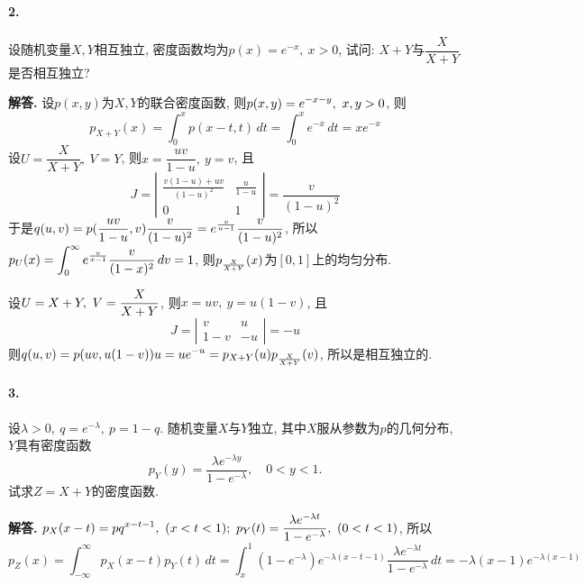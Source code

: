 \documentclass[12pt, a4paper, oneside]{ctexart}
\newenvironment{solution}{\par\noindent\textbf{解答. }}{\bigskip\par}
\begin{document}
\paragraph{2.}设随机变量$X,Y$相互独立, 密度函数均为$p(x) = e^{-x},\ x > 0$, 试问: $X+Y$与$\dfrac{X}{X+Y}$是否相互独立?
\begin{solution}
    设$p(x, y)$为$X,Y$的联合密度函数, 则$\displaystyle p(x, y) = e^{-x-y},\ x, y > 0$, 则
    \begin{equation*}
        p_{X+Y}(x)  = \int_0^xp(x-t,t)\,dt = \int_0^xe^{-x}\,dt = xe^{-x}
    \end{equation*}
    设$U = \dfrac{X}{X+Y},\ V= Y$, 则$x = \dfrac{uv}{1-u},\ y = v$, 且
    \begin{equation*}
        J = \left|\begin{matrix}
            \frac{v(1-u)+uv}{(1-u)^2}&\frac{u}{1-u}\\
            0&1
        \end{matrix}\right| = \frac{v}{(1-u)^2}
    \end{equation*}
    于是$\displaystyle q(u, v) = p(\frac{uv}{1-u},v)\frac{v}{(1-u)^2} = e^{\frac{v}{u-1}}\frac{v}{(1-u)^2}$, 所以$\displaystyle p_U(x) = \int_0^{\infty}e^{\frac{v}{x-1}}\frac{v}{(1-x)^2}\,dv = 1$, 则$\displaystyle p_{\frac{X}{X+Y}}(x)$为$[0,1]$上的均匀分布.

    设$\displaystyle U = X+Y,\ V=\frac{X}{X+Y}$, 则$x = uv,\ y = u(1-v)$, 且
    \begin{equation*}
        J = \left|\begin{matrix}
            v&u\\1-v&-u
        \end{matrix}\right| = -u
    \end{equation*}
    则$\displaystyle q(u,v) = p(uv, u(1-v))u = ue^{-u} = p_{X+Y}(u)p_{\frac{X}{X+Y}}(v)$, 所以是相互独立的.
\end{solution}
\paragraph{3.}设$\lambda > 0,\ q = e^{-\lambda},\ p=1-q$. 随机变量$X$与$Y$独立, 其中$X$服从参数为$p$的几何分布, $Y$具有密度函数
\begin{equation*}
    p_Y(y)=\frac{\lambda e^{-\lambda y}}{1-e^{-\lambda}},\quad 0 < y < 1.
\end{equation*}
试求$Z = X+Y$的密度函数.
\begin{solution}
    $\displaystyle p_X(x-t) = pq^{x-t-1},\ (x < t < 1);\ p_Y(t) = \frac{\lambda e^{-\lambda t}}{1-e^{-\lambda}},\ (0 < t < 1)$, 所以
    \begin{equation*}
            p_Z(x) = \int_{-\infty}^{\infty}p_X(x-t)p_Y(t)\,dt = \int_x^1(1-e^{-\lambda})e^{-\lambda(x-t-1)}\frac{\lambda e^{-\lambda t}}{1-e^{-\lambda}}\,dt = -\lambda(x-1)e^{-\lambda(x-1)}
    \end{equation*}
\end{solution}
\end{document}
